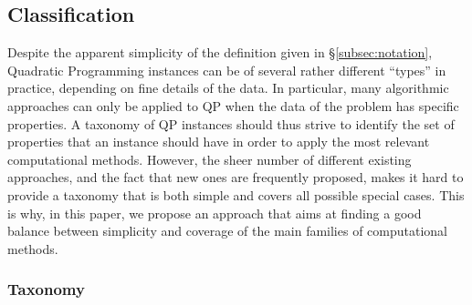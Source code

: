 

\subsection{Classification}\label{sec:classification}

Despite the apparent simplicity of the definition given in \S\ref{subsec:notation}, Quadratic Programming instances can be of several rather different ``types'' in practice, depending on fine details of the data. In particular, many algorithmic approaches can only be applied to QP when the data of the problem has specific properties. A taxonomy of QP instances should thus strive to identify the set of properties that an instance should have in order to apply the most relevant computational methods. However, the sheer number of different existing approaches, and the fact that new ones are frequently proposed, makes it hard to provide a taxonomy that is both simple and covers all possible special cases. This is why, in this paper, we propose an approach that aims at finding a good balance between simplicity and coverage of the main families of computational methods.

\subsubsection{Taxonomy}\label{ssec:taxonomy}


